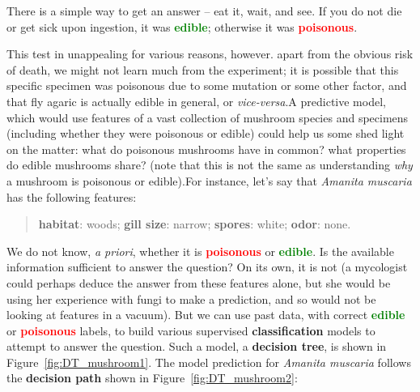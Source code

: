 \newl There is a simple way to get an answer -- eat it, wait, and see. If you do not die or get sick upon ingestion, it was \textbf{\textcolor{Green}{edible}}; otherwise it was \textbf{\textcolor{Red}{poisonous}}.\par This test in unappealing for various reasons, however. apart from the obvious risk of death, we might not learn much from the experiment; it is possible that this specific specimen was poisonous due to some mutation or some other factor, and that fly agaric is actually edible in general, or \textit{vice-versa}.\newl A predictive model, which would use features of a vast collection of mushroom species and specimens (including whether they were poisonous or edible) could help us some shed light on the matter: what do poisonous mushrooms have in common? what properties do edible mushrooms share?  (note that this is not the same as understanding \textit{why} a mushroom is poisonous or edible).\newl For instance, let's say that \textit{Amanita muscaria} has the following features: 
\begin{quote}
    \textbf{habitat}: woods; \textbf{gill size}: narrow; \textbf{spores}: white; \textbf{odor}: none.
\end{quote}
We do not know, \textit{a priori}, whether it is \textbf{\textcolor{Red}{poisonous}} or \textbf{\textcolor{Green}{edible}}. Is the available information sufficient to answer the question? On its own, it is not (a mycologist could perhaps deduce the answer from these features alone, but she would be using her experience with fungi to make a prediction, and so would not be looking at features in a vacuum). But we can use past data, with correct \textbf{\textcolor{Green}{edible}} or \textbf{\textcolor{Red}{poisonous}} labels, to build  various supervised \textbf{classification} models to attempt to answer the question. Such a model, a \textbf{decision tree}, is shown in Figure~\ref{fig:DT_mushroom1}.  The model prediction for \textit{Amanita muscaria} follows the \textbf{decision path} shown in Figure~\ref{fig:DT_mushroom2}: 
